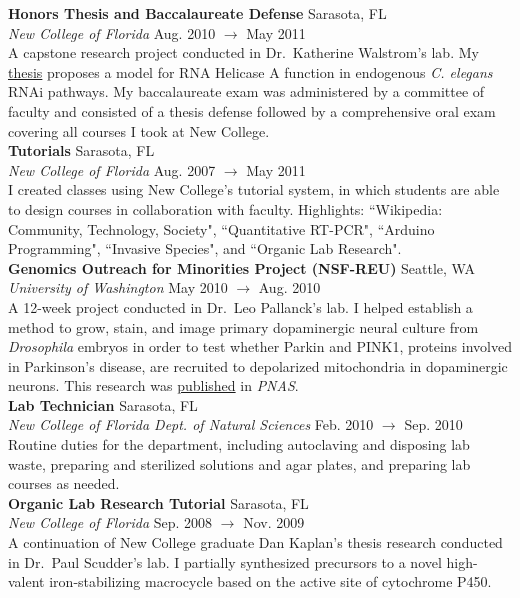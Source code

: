\documentclass[a4paper,12pt]{article}
\newcommand{\ressubheading}[4]{
        \textbf{#1} \hfill #2\\
        \textit{#3} \hfill #4 \\}
\begin{document}
    \ressubheading{Honors Thesis and Baccalaureate Defense}{Sarasota, FL}{New College of Florida}{Aug. 2010 $\rightarrow$ May 2011}
   A capstone research project conducted in Dr.\ Katherine Walstrom's lab.  My \hyperlink{thesispub}{thesis} proposes a model for RNA Helicase A function in endogenous \emph{C. elegans} RNAi pathways. My baccalaureate exam was administered by a committee of faculty and consisted of a thesis defense followed by a comprehensive oral exam covering all courses I took at New College.\\

    \ressubheading{Tutorials}{Sarasota, FL}{New College of Florida}{Aug. 2007 $\rightarrow$ May 2011}
    I created classes using New College's tutorial system, in which students are able to design courses in collaboration with faculty. Highlights: ``Wikipedia: Community, Technology, Society", ``Quantitative RT-PCR", ``Arduino Programming", ``Invasive Species", and ``Organic Lab Research".\\

    \ressubheading{Genomics Outreach for Minorities Project (NSF-REU)}{Seattle, WA}{University of Washington}{May 2010 $\rightarrow$ Aug. 2010}
    A 12-week project conducted in Dr.\ Leo Pallanck's lab. I helped establish a method to grow, stain, and image primary dopaminergic neural culture from \textit{Drosophila} embryos in order to test whether Parkin and PINK1, proteins involved in Parkinson's disease, are recruited to depolarized mitochondria in dopaminergic neurons. This research was \hyperlink{neuronpub}{published} in \textit{PNAS}.\\

    \ressubheading{Lab Technician}{Sarasota, FL}{New College of Florida Dept. of Natural Sciences}{Feb. 2010 $\rightarrow$ Sep. 2010}
    Routine duties for the department, including autoclaving and disposing lab waste, preparing and sterilized solutions and agar plates, and preparing lab courses as needed. \\

    \ressubheading{Organic Lab Research Tutorial}{Sarasota, FL}{New College of Florida}{Sep. 2008 $\rightarrow$ Nov. 2009}
    A continuation of New College graduate Dan Kaplan's thesis research conducted in Dr.\ Paul Scudder's lab. I partially synthesized precursors to a novel high-valent iron-stabilizing macrocycle based on the active site of cytochrome P450.\\%
\end{document}
